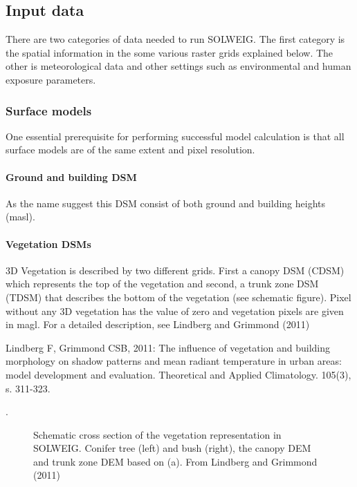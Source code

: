 \documentclass[letterpaper,10pt,english]{sphinxmanual}
\begin{document}
\subsection{Input data}
\label{\detokenize{OtherManuals/SOLWEIG:input-data}}
There are two categories of data needed to run SOLWEIG. The first
category is the spatial information in the some various raster grids
explained below. The other is meteorological data and other settings
such as environmental and human exposure parameters.


\subsubsection{Surface models}
\label{\detokenize{OtherManuals/SOLWEIG:surface-models}}
One essential prerequisite for performing successful model calculation
is that all surface models are of the same extent and pixel resolution.


\paragraph{Ground and building DSM}
\label{\detokenize{OtherManuals/SOLWEIG:ground-and-building-dsm}}
As the name suggest this DSM consist of both ground and building heights
(masl).


\paragraph{Vegetation DSMs}
\label{\detokenize{OtherManuals/SOLWEIG:vegetation-dsms}}
3D Vegetation is described by two different grids. First a canopy DSM
(CDSM) which represents the top of the vegetation and second, a trunk
zone DSM (TDSM) that describes the bottom of the vegetation (see
schematic figure). Pixel without any 3D vegetation has the value of zero
and vegetation pixels are given in magl. For a detailed description, see
Lindberg and Grimmond (2011)  %
\begin{footnote}[2]\sphinxAtStartFootnote
Lindberg F, Grimmond CSB, 2011: The influence of vegetation and
building morphology on shadow patterns and mean radiant temperature
in urban areas: model development and evaluation. Theoretical and
Applied Climatology. 105(3), s. 311-323.
%
\end{footnote}.

\begin{figure}[htbp]
\centering
\capstart

\noindent{}
\caption{Schematic cross section of the vegetation representation in SOLWEIG.
 Conifer tree (left) and bush (right),  the canopy DEM and
 trunk zone DEM based on (a). From Lindberg and Grimmond (2011)}\label{\detokenize{OtherManuals/SOLWEIG:id20}}\end{figure}
\end{document}

